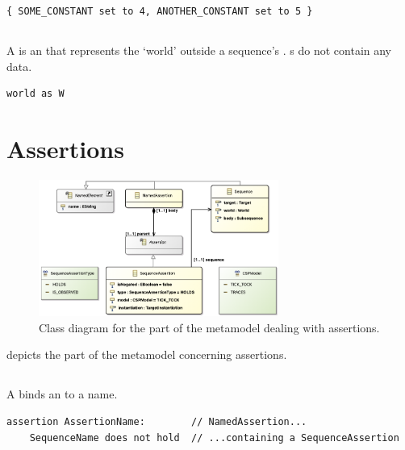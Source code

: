 \begin{lstlisting}[style=Example]
{ SOME_CONSTANT set to 4, ANOTHER_CONSTANT set to 5 }
\end{lstlisting}

\subsection{\mworld}\label{ssec:metamodel-actors-world}

A \mworld{} is an \mactor{} that represents the `world' outside a sequence's
\mtarget.  \mworld s do not contain any data.

\begin{lstlisting}[style=Example]
world as W
\end{lstlisting}


\section{Assertions}\label{sec:metamodel-assertions}

\begin{figure}
	\centering
	\includegraphics[width=0.7\textwidth]{diagrams/assertions.png}
	\caption{Class diagram for the part of the \langname{} metamodel dealing with assertions.}
	\label{fig:metamodel-assertions}
\end{figure}

 depicts the part of the metamodel concerning
assertions.

\subsection{\mnamedassertion}

A \mnamedassertion{} binds an \massertion{} to a name.

\begin{lstlisting}[style=Example]
assertion AssertionName:        // NamedAssertion...
    SequenceName does not hold  // ...containing a SequenceAssertion
\end{lstlisting}

